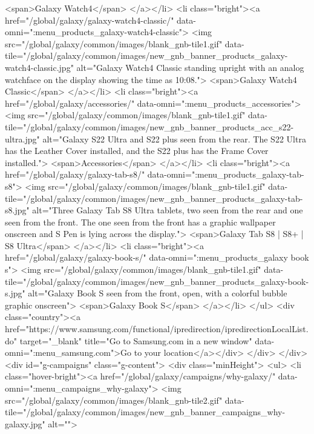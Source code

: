 								<span>Galaxy Watch4</span>
							</a></li>
							<li class="bright"><a href="/global/galaxy/galaxy-watch4-classic/" data-omni=":menu_products_galaxy-watch4-classic">
								<img src="/global/galaxy/common/images/blank_gnb-tile1.gif"
									data-tile="/global/galaxy/common/images/new_gnb_banner_products_galaxy-watch4-classic.jpg"
									alt="Galaxy Watch4 Classic standing upright with an analog watchface on the display showing the time as 10:08.">
									<span>Galaxy Watch4 Classic</span>
							</a></li>
							<li class="bright"><a href="/global/galaxy/accessories/" data-omni=":menu_products_accessories">
								<img src="/global/galaxy/common/images/blank_gnb-tile1.gif"
									data-tile="/global/galaxy/common/images/new_gnb_banner_products_acc_s22-ultra.jpg"
									alt="Galaxy S22 Ultra and S22 plus seen from the rear. The S22 Ultra has the Leather Cover installed, and the S22 plus has the Frame Cover installed.">
								<span>Accessories</span>
							</a></li>
							<li class="bright"><a href="/global/galaxy/galaxy-tab-s8/" data-omni=":menu_products_galaxy-tab-s8">
								<img src="/global/galaxy/common/images/blank_gnb-tile1.gif"
									data-tile="/global/galaxy/common/images/new_gnb_banner_products_galaxy-tab-s8.jpg"
									alt="Three Galaxy Tab S8 Ultra tablets, two seen from the rear and one seen from the front. The one seen from the front has a graphic wallpaper onscreen and S Pen is lying across the display.">
								<span>Galaxy Tab S8 | S8+ | S8 Ultra</span>
							</a></li>
							<li class="bright"><a href="/global/galaxy/galaxy-book-s/" data-omni=":menu_products_galaxy book s">
								<img src="/global/galaxy/common/images/blank_gnb-tile1.gif"
									data-tile="/global/galaxy/common/images/new_gnb_banner_products_galaxy-book-s.jpg"
									alt="Galaxy Book S seen from the front, open, with a colorful bubble graphic onscreen">
								<span>Galaxy Book S</span>
							</a></li>
						</ul>
						<div class="country"><a href="https://www.samsung.com/functional/ipredirection/ipredirectionLocalList.do" target="_blank" title="Go to Samsung.com in a new window" data-omni=":menu_samsung.com">Go to your location</a></div>
					</div>
				</div>
				<div id="g-campaigns" class="g-content">
					<div class="minHeight">
						<ul>
							<li class="hover-bright"><a href="/global/galaxy/campaigns/why-galaxy/" data-omni=":menu_campaigns_why-galaxy">
								<img src="/global/galaxy/common/images/blank_gnb-tile2.gif"
									data-tile="/global/galaxy/common/images/new_gnb_banner_campaigns_why-galaxy.jpg"
									alt="">
